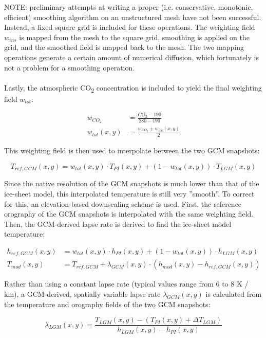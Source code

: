 \documentclass{article}
\begin{document}
NOTE: preliminary attempts at writing a proper (i.e. conservative, monotonic, efficient) smoothing algorithm on an unstructured mesh have not been successful. Instead, a fixed square grid is included for these operations. The weighting field $w_{ins}$ is mapped from the mesh to the square grid, smoothing is applied on the grid, and the smoothed field is mapped back to the mesh. The two mapping operations generate a certain amount of numerical diffusion, which fortunately is not a problem for a smoothing operation.\\
\\
Lastly, the atmospheric CO\textsubscript{2} concentration is included to yield the final weighting field $w_{tot}$:

\begin{align}
w_{CO_2} &= \frac{CO_2 - 190}{280 - 190}\\
w_{tot}(x,y) &= \frac{w_{CO_2} + w_{ice}(x,y)}{2}
\end{align}

This weighting field is then used to interpolate between the two GCM snapshots:

\begin{equation}
T_{ref,GCM}(x,y) = w_{tot} (x,y) \cdot T_{PI} (x,y) + \left( 1 - w_{tot} (x,y) \right) \cdot T_{LGM} (x,y)
\end{equation}

Since the native resolution of the GCM snapshots is much lower than that of the ice-sheet model, this interpolated temperature is still very ''smooth''. To correct for this, an elevation-based downscaling scheme is used. First, the reference orography of the GCM snapshots is interpolated with the same weighting field. Then, the GCM-derived lapse rate is derived to find the ice-sheet model temperature:

\begin{align}
h_{ref,GCM}(x,y) &= w_{tot} (x,y) \cdot h_{PI} (x,y) + \left( 1 - w_{tot} (x,y) \right) \cdot h_{LGM} (x,y)\\
T_{mod} (x,y) &= T_{ref,GCM} + \lambda_{GCM} (x,y) \cdot \left( h_{mod} (x,y) - h_{ref,GCM} (x,y) \right)
\end{align}

Rather than using a constant lapse rate (typical values range from 6 to 8 K / km), a GCM-derived, spatially variable lapse rate $\lambda_{GCM} (x,y)$ is calculated from the temperature and orography fields of the two GCM snapshots:

\begin{equation}
\lambda_{LGM} (x,y) = \frac{T_{LGM}(x,y) - \left( T_{PI} (x,y) + \Delta T_{LGM} \right) }{h_{LGM} (x,y) - h_{PI} (x,y)}
\end{equation}
\end{document}
